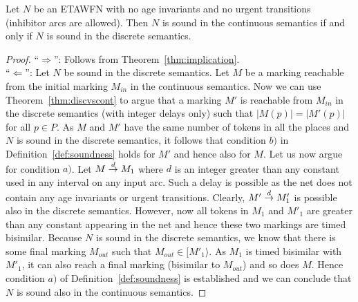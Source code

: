 \begin{theorem} \label{thm:contdiscok}
Let $N$ be an ETAWFN with no age invariants and no urgent transitions
(inhibitor arcs are allowed). Then $N$ is sound in the
continuous semantics if and only if $N$ is sound in the discrete semantics.
\end{theorem}
\begin{proof}
``$\Rightarrow$'': Follows from Theorem~\ref{thm:implication}.\\
\indent ``$\Leftarrow$'': Let $N$ be sound in the discrete semantics.
Let $M$ be a marking
reachable from the initial marking $M_\mathit{in}$ in the continuous
semantics.
Now we can use Theorem~\ref{thm:discvscont} to argue that a marking $M'$
is reachable from $M_\mathit{in}$ in the discrete semantics (with integer
delays only) such that $|M(p)|=|M'(p)|$ for all $p \in P$.
As $M$ and $M'$ have the same number of tokens in all the places
and $N$ is sound in the discrete semantics, it follows that condition $b)$
in Definition~\ref{def:soundness} holds for $M'$ and hence also for $M$.
Let us now argue for condition $a)$.
Let $M \stackrel{d}{\rightarrow} M_1$ where $d$ is an integer
greater than any constant used in any interval on any input arc.
Such a delay is possible as the net does not contain
any age invariants or urgent transitions. Clearly, $M' \stackrel{d}{\rightarrow} M'_1$
is possible also in the discrete semantics. However, now
all tokens in $M_1$ and $M'_1$ are greater than any constant appearing
in the net and hence these two markings are timed bisimilar.
Because $N$ is sound in the discrete semantics, we know that
there is some final marking $M_\mathit{out}$ such that
$M_\mathit{out} \in [M'_1\rangle$. As $M_1$ is timed bisimilar with
$M'_1$, it can also reach a final marking (bisimilar to $M_\mathit{out}$)
and so does $M$. Hence condition $a)$ of Definition~\ref{def:soundness}
is established and we can conclude that
$N$ is sound also in the continuous semantics.
\end{proof}


